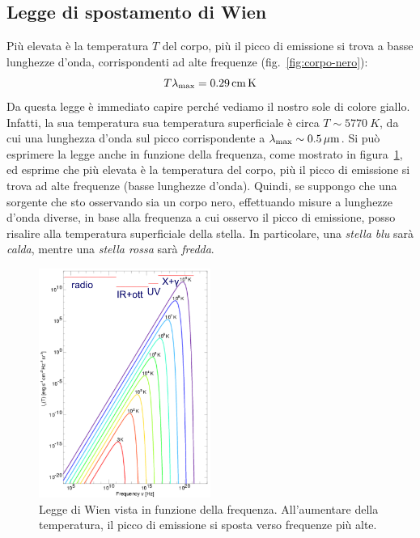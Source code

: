 \subsection{Legge di spostamento di Wien}\label{sec:legge-wien}
Più elevata è la temperatura $T$ del corpo, più il picco di emissione si trova a basse lunghezze d'onda, corrispondenti ad alte frequenze (fig.~\ref{fig:corpo-nero}):
\begin{equation}\label{eq:legge-wien}
    T \lambda_\textup{max} = \SI{0.29}{cm.K}
\end{equation}
Da questa legge è immediato capire perché vediamo il nostro sole di colore giallo. Infatti, la sua temperatura sua temperatura superficiale è circa $T \sim \SI{5770}{K}$, da cui una lunghezza d'onda sul picco corrispondente a $\lambda_\textup{max} \sim \SI{0.5}{\mu m}$. Si può esprimere la legge anche in funzione della frequenza, come mostrato in figura~\ref{fig:legge-wien}, ed esprime che più elevata è la temperatura del corpo, più il picco di emissione si trova ad alte frequenze (basse lunghezze d'onda). Quindi, se suppongo che una sorgente che sto osservando sia un corpo nero, effettuando misure a lunghezze d'onda diverse, in base alla frequenza a cui osservo il picco di emissione, posso risalire alla temperatura superficiale della stella. In particolare, una \emph{stella blu} sarà \emph{calda}, mentre una \emph{stella rossa} sarà \emph{fredda}.

\begin{figure}
\centering
\includegraphics[width=0.5\textwidth]{immagini/legge-wien.png}
\caption{Legge di Wien vista in funzione della frequenza. All'aumentare della temperatura, il picco di emissione si sposta verso frequenze più alte.}
\label{fig:legge-wien}
\end{figure}


